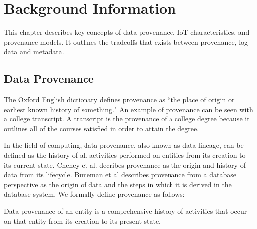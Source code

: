 \chapter{Background Information}

This chapter describes key concepts of data provenance, IoT characteristics, and provenance models. It outlines the tradeoffs that exists between provenance, log data and metadata. 

\section{Data Provenance}
The Oxford English dictionary defines provenance \cite{TCDP1999} as ``the place of origin or earliest known history of something."  An example of provenance can be seen with a college transcript. A transcript is the provenance of a college degree because it outlines all of the courses satisfied in order to attain the degree.
\par In the field of computing, data provenance, also known as  data lineage, can be defined as the history of all activities performed on entities from its creation to its current state. Cheney et al. \cite{cheney_provenance_2009} decribes provenance as the origin and history of data from its lifecycle. Buneman et al \cite{buneman_why_2001} describes provenance from a database perspective as the origin of data and the steps in which it is derived in the database system.  We formally define provenance as follows:


\begin{definition}

Data provenance of an entity is a comprehensive history of activities that occur on that entity from its creation to its present state.

\end{definition}


